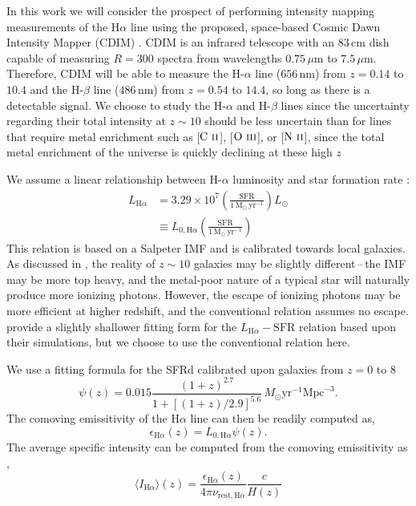 \documentclass[a4paper,fleqn,usenatbib]{mnras}
\newcommand{\beq}{\begin{equation}}
\newcommand{\eeq}{\end{equation}}
\newcommand{\avg}[1]{\ensuremath{\langle #1 \rangle}}
\newcommand{\CII}{\ensuremath{\text{C~\textsc{ii}}}}
\newcommand{\OIII}{\ensuremath{\text{O~\textsc{iii}}}}
\newcommand{\NII}{\ensuremath{\text{N~\textsc{ii}}}}
\newcommand{\Ha}{\ensuremath{\text{H}\alpha}}
\newcommand{\Msun}{\ensuremath{\text{M}_\odot}}
\newcommand{\Mpc}{\ensuremath{\text{Mpc}}}
\newcommand{\SFR}{\ensuremath{\text{SFR}}}
\newcommand{\yr}{\ensuremath{\text{yr}}}
\begin{document}
In this work we will consider the prospect of performing intensity mapping
measurements of the H$\alpha$ line using the proposed, space-based Cosmic Dawn
Intensity Mapper (CDIM) \citep{2019arXiv190303144C}. CDIM is an infrared
telescope with an $83\,\text{cm}$ dish capable of measuring $R=300$ spectra
from wavelengths $0.75\,\mu\text{m}$ to $7.5\,\mu\text{m}$. Therefore, CDIM
will be able to measure the H-$\alpha$ line ($656\,\text{nm}$) from $z=0.14$
to $10.4$ and the H-$\beta$ line ($486\,\text{nm}$) from $z=0.54$ to $14.4$,
so long as there is a detectable signal. We choose to study the H-$\alpha$ and
H-$\beta$ lines since the uncertainty regarding their total intensity at
$z\sim10$ should be less uncertain than for lines that require metal
enrichment such as [\CII], [\OIII], or [\NII], since the total metal
enrichment of the universe is quickly declining at these high $z$ 

We assume a linear relationship between H-$\alpha$ luminosity and star
formation rate \citep{1998ARA&A..36..189K}:
\beq \label{eq:LHalpha_SFR}
\begin{split}
L_{\Ha} &= 3.29\times10^{7} \left(\frac{\SFR}{1\,\Msun\,\yr^{-1}}\right) L_{\odot} \\
        &\equiv L_{0,\Ha} \left(\frac{\SFR}{1\,\Msun\,\yr^{-1}}\right)
\end{split}
\eeq
This relation is based on a Salpeter IMF and is calibrated towards local
galaxies. As discussed in \citet{2019MNRAS.487.5902K}, the reality of
$z\sim10$ galaxies may be slightly different\,--\,the IMF may be more top
heavy, and the metal-poor nature of a typical star will naturally produce more
ionizing photons. However, the escape of ionizing photons may be more
efficient at higher redshift, and the conventional relation assumes no escape.
\citet{2019MNRAS.487.5902K} provide a slightly shallower fitting form for the
$L_{\Ha}-\SFR$ relation based upon their simulations, but we choose to use the
conventional relation here.

We use a fitting formula for the SFRd calibrated upon galaxies from $z=0$ to
$8$ \citep{2014ARA&A..52..415M}
\beq \label{eq:sfrd}
\psi(z) = 0.015 \frac{(1+z)^{2.7}}{1+\left[(1+z)/2.9\right]^{5.6}}\,M_{\odot}\yr^{-1}\Mpc^{-3} \text{.}
\eeq
The comoving emissitivity of the \Ha{} line can then be readily computed as,
\beq \label{eq:Ha_emiss}
\epsilon_{\Ha}(z) = L_{0,\Ha} \psi(z)\text{.}
\eeq
The average specific intensity can be computed from the comoving emissitivity
as \citep{2011ApJ...741...70L,2013ApJ...768...15P},
\beq \label{eq:int_from_em}
\avg{I_{\Ha}}(z) = \frac{\epsilon_{\Ha}(z)}{4\pi\nu_{\text{rest},\Ha}} \frac{c}{H(z)}
\eeq
\end{document}
